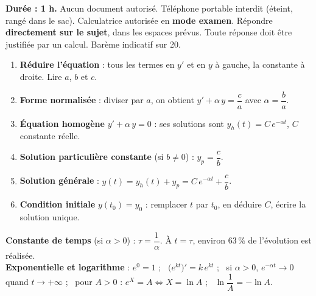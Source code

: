 \documentclass[a4paper,11pt]{article}
\begin{document}
\vspace{6pt}
\begin{tcolorbox}[colback=uimmlightgray, colframe=uimmgray, boxrule=0.6pt, arc=2pt, left=8pt, right=8pt, top=4pt, bottom=4pt]
\small\textbf{Durée : 1 h.} Aucun document autorisé. Téléphone portable interdit (éteint, rangé dans le sac). Calculatrice autorisée en \textbf{mode examen}. Répondre \textbf{directement sur le sujet}, dans les espaces prévus. Toute réponse doit être justifiée par un calcul. Barème indicatif sur 20.
\end{tcolorbox}

\begin{tcolorbox}[colback=uimmlightblue!40, colframe=uimmblue, boxrule=0.8pt, arc=2pt, left=8pt, right=8pt, top=4pt, bottom=4pt, title={\bfseries Rappel : résoudre $a\,y' + b\,y = c$ ($a$, $b$, $c$ constantes, $a \neq 0$)}, coltitle=white, colbacktitle=uimmblue]
\small
\begin{enumerate}[leftmargin=*, itemsep=1pt, topsep=1pt]
  \item \textbf{Réduire l'équation} : tous les termes en $y'$ et en $y$ à gauche, la constante à droite. Lire $a$, $b$ et $c$.
  \item \textbf{Forme normalisée} : diviser par $a$, on obtient $y' + \alpha\,y = \dfrac{c}{a}$ avec $\alpha = \dfrac{b}{a}$.
  \item \textbf{Équation homogène} $y' + \alpha\,y = 0$ : ses solutions sont $y_h(t) = C\,e^{-\alpha t}$, $C$ constante réelle.
  \item \textbf{Solution particulière constante} (si $b \neq 0$) : $y_p = \dfrac{c}{b}$.
  \item \textbf{Solution générale} : $y(t) = y_h(t) + y_p = C\,e^{-\alpha t} + \dfrac{c}{b}$.
  \item \textbf{Condition initiale} $y(t_0) = y_0$ : remplacer $t$ par $t_0$, en déduire $C$, écrire la solution unique.
\end{enumerate}
\textbf{Constante de temps} (si $\alpha > 0$) : $\tau = \dfrac{1}{\alpha}$. À $t = \tau$, environ $63\,\%$ de l'évolution est réalisée.\\
\textbf{Exponentielle et logarithme} : $e^{0} = 1$ ; \ $\big(e^{kt}\big)' = k\,e^{kt}$ ; \ si $\alpha > 0$, $e^{-\alpha t} \to 0$ quand $t \to +\infty$ ; \ pour $A > 0$ : $e^{X} = A \iff X = \ln A$ ; \ $\ln\dfrac{1}{A} = -\ln A$.
\end{tcolorbox}
\end{document}
